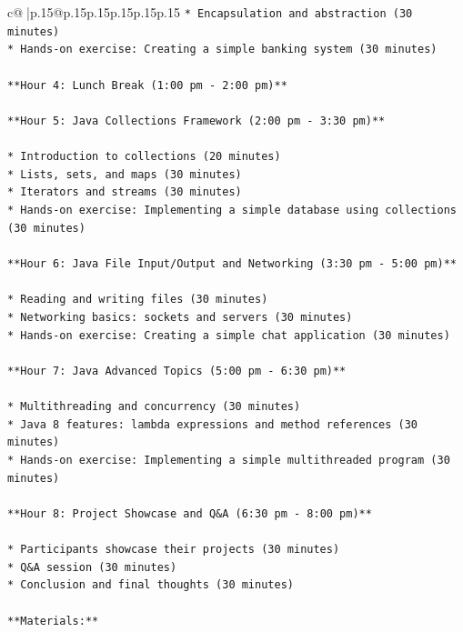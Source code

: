 \documentclass{article}
\begin{document}
{\begin{supertabular}{c@{$\;$}|p{.15\linewidth}@{}p{.15\linewidth}p{.15\linewidth}p{.15\linewidth}p{.15\linewidth}p{.15\linewidth}}
{{{\texttt{* Encapsulation and abstraction (30 minutes)} \\
\texttt{* Hands{-}on exercise: Creating a simple banking system (30 minutes)} \\
\\ 
\texttt{**Hour 4: Lunch Break (1:00 pm {-} 2:00 pm)**} \\
\\ 
\texttt{**Hour 5: Java Collections Framework (2:00 pm {-} 3:30 pm)**} \\
\\ 
\texttt{* Introduction to collections (20 minutes)} \\
\texttt{* Lists, sets, and maps (30 minutes)} \\
\texttt{* Iterators and streams (30 minutes)} \\
\texttt{* Hands{-}on exercise: Implementing a simple database using collections (30 minutes)} \\
\\ 
\texttt{**Hour 6: Java File Input/Output and Networking (3:30 pm {-} 5:00 pm)**} \\
\\ 
\texttt{* Reading and writing files (30 minutes)} \\
\texttt{* Networking basics: sockets and servers (30 minutes)} \\
\texttt{* Hands{-}on exercise: Creating a simple chat application (30 minutes)} \\
\\ 
\texttt{**Hour 7: Java Advanced Topics (5:00 pm {-} 6:30 pm)**} \\
\\ 
\texttt{* Multithreading and concurrency (30 minutes)} \\
\texttt{* Java 8 features: lambda expressions and method references (30 minutes)} \\
\texttt{* Hands{-}on exercise: Implementing a simple multithreaded program (30 minutes)} \\
\\ 
\texttt{**Hour 8: Project Showcase and Q\&A (6:30 pm {-} 8:00 pm)**} \\
\\ 
\texttt{* Participants showcase their projects (30 minutes)} \\
\texttt{* Q\&A session (30 minutes)} \\
\texttt{* Conclusion and final thoughts (30 minutes)} \\
\\ 
\texttt{**Materials:**} \\
}}}
\end{supertabular}}
\end{document}
